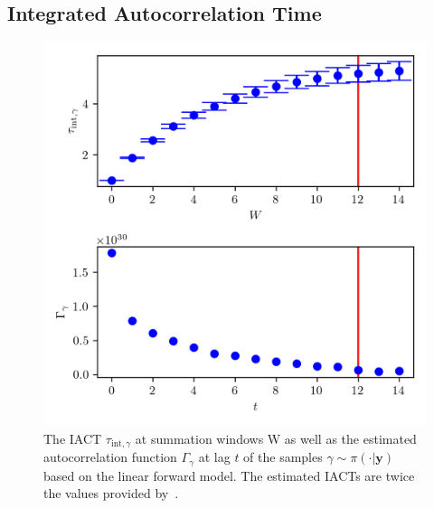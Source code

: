 \subsection{Integrated Autocorrelation Time} 
\begin{figure}[ht!]
	\centering
	\includegraphics{UwerrTauIntFirstO3gam.png}
	\caption[IACT and autocorrelation of samples $\gamma \sim \pi( \cdot | \bm{y})$, for linear model.]{The IACT $\tau_{\text{int},\gamma}$ at summation windows W as well as the estimated autocorrelation function $\Gamma_{\gamma}$ at lag $t$ of the samples $\gamma \sim \pi(\cdot| \bm{y})$ based on the linear forward model.
	The estimated IACTs are twice the values provided by~\cite{drikHesse, UwerrM}.}
	\label{fig:IATCGamLin}
\end{figure}
